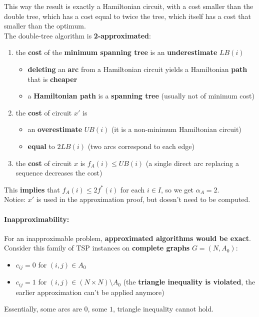 This way the result is exactly a Hamiltonian circuit, with a cost smaller than the double tree, which has a cost equal to twice the tree, which itself has a cost that smaller than the optimum.\\

The double-tree algorithm is \textbf{2-approximated}:
\begin{enumerate}
	\item the \textbf{cost} of the \textbf{minimum spanning tree} is an \textbf{underestimate} $LB (i )$
	\begin{itemize}
		\item \textbf{deleting} an \textbf{arc} from a Hamiltonian circuit yields a Hamiltonian \textbf{path} that is \textbf{cheaper}
		\item a \textbf{Hamiltonian path} is a \textbf{spanning tree} (usually not of minimum cost)
	\end{itemize}
	\item the \textbf{cost} of circuit $x'$ is
	\begin{itemize}
		\item an \textbf{overestimate} $UB (i )$ (it is a non-minimum Hamiltonian circuit)
		\item \textbf{equal} to $2LB (i )$ (two arcs correspond to each edge)
	\end{itemize}
	\item the \textbf{cost} of circuit $x$ is $f_A (i ) \leq UB (i )$ (a single direct arc replacing a sequence decreases the cost)
\end{enumerate}
This \textbf{implies} that $f_A (i ) \leq 2f^\ast (i )$ for each $i \in I$, so we get $\alpha_A = 2$.\\

Notice: $x'$ is used in the approximation proof, but doesn't need to be computed.\\

\newpage

\paragraph{Inapproximability:} For an inapproximable problem, \textbf{approximated algorithms would be exact}.\\
Consider this family of TSP instances on \textbf{complete graphs} $G = (N, A_0)$:
\begin{itemize}
	\item $c_{ij} = 0$ for $(i, j) \in A_0$
	\item $c_{ij} = 1$ for $(i, j) \in  (N \times N) \setminus A_0$ (the \textbf{triangle inequality is violated}, the earlier approximation can't be applied anymore)
\end{itemize}
Essentially, some arcs are $0$, some $1$, triangle inequality cannot hold.\\

